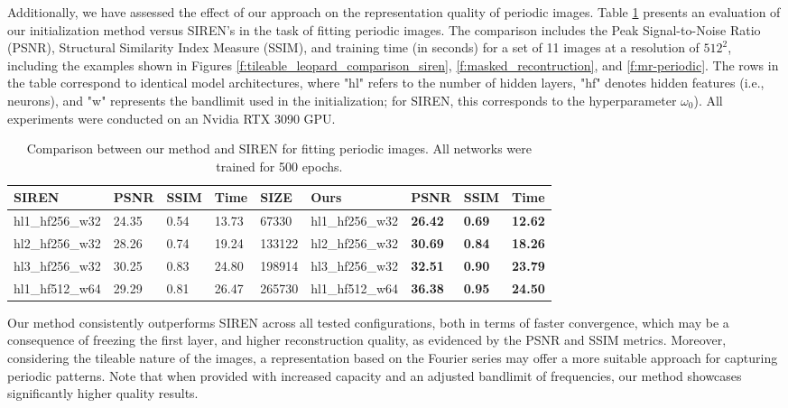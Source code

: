 Additionally, we have assessed the effect of our approach on the representation quality of periodic images. Table \ref{t:comparison-siren} presents an evaluation of our initialization method versus SIREN's in the task of fitting periodic images. The comparison includes the Peak Signal-to-Noise Ratio (PSNR), Structural Similarity Index Measure (SSIM), and training time (in seconds) for a set of 11 images at a resolution of \(512^2\), including the examples shown in Figures \ref{f:tileable_leopard_comparison_siren}, \ref{f:masked_recontruction}, and \ref{f:mr-periodic}. The rows in the table correspond to identical model architectures, where "hl" refers to the number of hidden layers, "hf" denotes hidden features (i.e., neurons), and "w" represents the bandlimit used in the initialization; for SIREN, this corresponds to the hyperparameter \(\omega_0\)). All experiments were conducted on an Nvidia RTX 3090 GPU.

\begin{table}[h]
\footnotesize
\begin{tabular}{llll|l|llll}
\hline
\textbf{SIREN}            & \textbf{PSNR}  & \textbf{SSIM} & \textbf{Time} & \textbf{SIZE} & \textbf{Ours}        & \textbf{PSNR}  & \textbf{SSIM} & \textbf{Time} \\
\hline
hl1\_hf256\_w32 & 24.35          & 0.54          & 13.73          & 67330       & hl1\_hf256\_w32 & \textbf{26.42} & \textbf{0.69} & \textbf{12.62} \\
hl2\_hf256\_w32 & 28.26          & 0.74          & 19.24          & 133122      & hl2\_hf256\_w32 & \textbf{30.69} & \textbf{0.84} & \textbf{18.26} \\
hl3\_hf256\_w32 & 30.25          & 0.83          & 24.80          & 198914      & hl3\_hf256\_w32 & \textbf{32.51} & \textbf{0.90} & \textbf{23.79} \\
\hline
hl1\_hf512\_w64 & 29.29 & 0.81 & 26.47          & 265730      & hl1\_hf512\_w64 & \textbf{36.38} & \textbf{0.95} & \textbf{24.50}\\ 
\hline
\end{tabular}
\caption{Comparison between our method and SIREN for fitting periodic images. All networks were trained for 500 epochs.}
\label{t:comparison-siren}
\end{table}

Our method consistently outperforms SIREN across all tested configurations, both in terms of faster convergence, which may be a consequence of freezing the first layer, and higher reconstruction quality, as evidenced by the PSNR and SSIM metrics. Moreover, considering the tileable nature of the images, a representation based on the Fourier series may offer a more suitable approach for capturing periodic patterns. Note that when provided with increased capacity and an adjusted bandlimit of frequencies, our method showcases significantly higher quality results.


